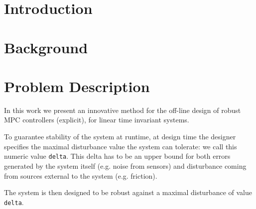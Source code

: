 \documentclass[sigconf]{acmart}
\begin{document}

%

%

%
\maketitle

\section{Introduction}
\section{Background}
\section{Problem Description}
In this work we present an innovative method for the off-line design of robust MPC controllers (explicit), for linear time invariant systems.

To guarantee stability of the system at runtime, at design time the designer specifies the maximal disturbance value the system can tolerate: we call this numeric value \texttt{delta}. This delta has to be an upper bound for both errors generated by the system itself (e.g. noise from sensors) and disturbance coming from sources external to the system (e.g. friction).

The system is then designed to be robust against a maximal disturbance of value \texttt{delta}.
\end{document}
